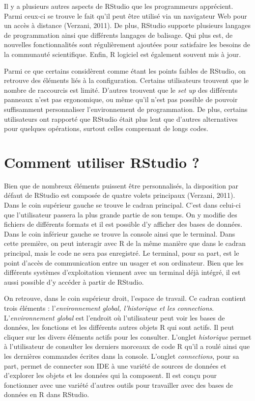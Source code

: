 \documentclass[
  letterpaper,
]{scrbook}
\begin{document}
Il y a plusieurs autres aspects de RStudio que les programmeurs
apprécient. Parmi ceux-ci se trouve le fait qu'il peut être utilisé via
un navigateur Web pour un accès à distance (Verzani, 2011). De plus,
RStudio supporte plusieurs langages de programmation ainsi que
différents langages de balisage. Qui plus est, de nouvelles
fonctionnalités sont régulièrement ajoutées pour satisfaire les besoins
de la communauté scientifique. Enfin, R logiciel est également souvent
mis à jour.

Parmi ce que certains considèrent comme étant les points faibles de
RStudio, on retrouve des éléments liés à la configuration. Certains
utilisateurs trouvent que le nombre de raccourcis est limité. D'autres
trouvent que le \emph{set up} des différents panneaux n'est pas
ergonomique, ou même qu'il n'est pas possible de pouvoir suffisamment
personnaliser l'environnement de programmation. De plus, certains
utilisateurs ont rapporté que RStudio était plus lent que d'autres
alternatives pour quelques opérations, surtout celles comprenant de
longs codes.

\hypertarget{comment-utiliser-rstudio}{%
\section{Comment utiliser RStudio ?}\label{comment-utiliser-rstudio}}

Bien que de nombreux éléments puissent être personnalisés, la
disposition par défaut de RStudio est composée de quatre volets
principaux (Verzani, 2011). Dans le coin supérieur gauche se trouve le
cadran principal. C'est dans celui-ci que l'utilisateur passera la plus
grande partie de son temps. On y modifie des fichiers de différents
formats et il est possible d'y afficher des bases de données. Dans le
coin inférieur gauche se trouve la console ainsi que le terminal. Dans
cette première, on peut interagir avec R de la même manière que dans le
cadran principal, mais le code ne sera pas enregistré. Le terminal, pour
sa part, est le point d'accès de communication entre un usager et son
ordinateur. Bien que les différents systèmes d'exploitation viennent
avec un terminal déjà intégré, il est aussi possible d'y accéder à
partir de RStudio.

On retrouve, dans le coin supérieur droit, l'espace de travail. Ce
cadran contient trois éléments : l'\emph{environnement global,
l'historique et les connections}. L'\emph{environnement global} est
l'endroit où l'utilisateur peut voir les bases de données, les fonctions
et les différents autres objets R qui sont actifs. Il peut cliquer sur
les divers éléments actifs pour les consulter. L'onglet
\emph{historique} permet à l'utilisateur de consulter les derniers
morceaux de code R qu'il a roulé ainsi que les dernières commandes
écrites dans la console. L'onglet \emph{connections}, pour sa part,
permet de connecter son IDE à une variété de sources de données et
d'explorer les objets et les données qui la composent. Il est conçu pour
fonctionner avec une variété d'autres outils pour travailler avec des
bases de données en R dans RStudio.
\end{document}
